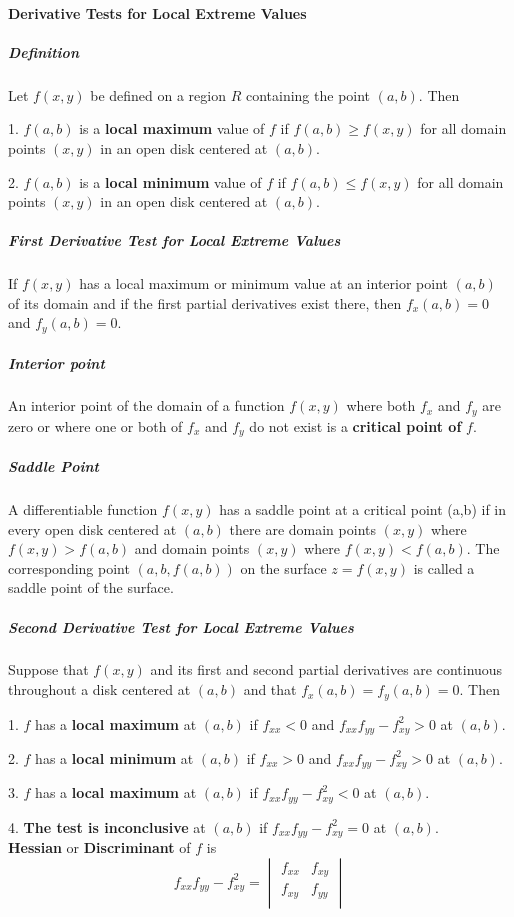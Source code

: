 \documentclass{article}
\begin{document}
            \paragraph{Derivative Tests for Local Extreme Values}
                \subparagraph{Definition} Let $f(x,y)$ be defined on a region $R$ containing the point $(a,b)$. Then
                \par 1. $f(a,b)$ is a \textbf{local maximum} value of $f$ if $f(a,b)\ge f(x,y)$ for all domain points $(x,y)$ in an open disk centered at $(a,b)$.
                \par 2. $f(a,b)$ is a \textbf{local minimum} value of $f$ if $f(a,b)\le f(x,y)$ for all domain points $(x,y)$ in an open disk centered at $(a,b)$.
                \subparagraph{First Derivative Test for Local Extreme Values} If $f(x,y)$ has a local maximum or minimum value at an interior point $(a,b)$ of its domain and if the first partial derivatives exist there, then $f_x(a,b)=0$ and $f_y(a,b)=0$.
                \subparagraph{Interior point} An interior point of the domain of a function $f(x,y)$ where both $f_x$ and $f_y$ are zero or where one or both of $f_x$ and $f_y$ do not exist is a \textbf{critical point of} $f$.
                \subparagraph{Saddle Point} A differentiable function $f(x,y)$ has a saddle point at a critical point (a,b) if in every open disk centered at $(a,b)$ there are domain points $(x,y)$ where $f(x,y)>f(a,b)$ and domain points $(x,y)$ where $f(x,y)<f(a,b)$. The corresponding point $(a,b,f(a,b))$ on the surface $z=f(x,y)$ is called a saddle point of the surface.
                \subparagraph{Second Derivative Test for Local Extreme Values} Suppose that $f(x,y)$ and its first and second partial derivatives are continuous throughout a disk centered at $(a,b)$ and that $f_x(a,b)=f_y(a,b)=0$. Then
                \par 1. $f$ has a \textbf{local maximum} at $(a,b)$ if $f_{xx}<0$ and $f_{xx}f_{yy}-f_{xy}^2>0$ at $(a,b)$.
                \par 2. $f$ has a \textbf{local minimum} at $(a,b)$ if $f_{xx}>0$ and $f_{xx}f_{yy}-f_{xy}^2>0$ at $(a,b)$.
                \par 3. $f$ has a \textbf{local maximum} at $(a,b)$ if $f_{xx}f_{yy}-f_{xy}^2<0$ at $(a,b)$.
                \par 4. \textbf{The test is inconclusive} at $(a,b)$ if $f_{xx}f_{yy}-f_{xy}^2=0$ at $(a,b)$.\\
                \textbf{Hessian} or \textbf{Discriminant} of $f$ is
                \[f_{xx}f_{yy}-f_{xy}^2=
                \begin{vmatrix}
                    f_{xx}&f_{xy}\\
                    f_{xy}&f_{yy}\\
                \end{vmatrix}\]
\end{document}
